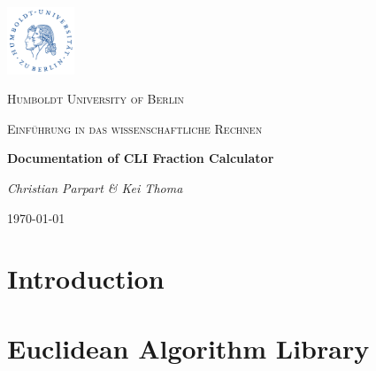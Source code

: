 \documentclass[refman]{scrartcl}
\begin{document}

\begin{titlepage}
	\centering
	\includegraphics[width=0.15\textwidth]{graphics/huberlin_logo}\par\vspace{1cm}
	{\scshape\LARGE Humboldt University of Berlin \par}
	\vspace{1cm}
	{\scshape\Large Einf{\"u}hrung in das wissenschaftliche Rechnen \par}
	\vspace{1.5cm}
	{\huge\bfseries Documentation of CLI Fraction Calculator\par}
	\vspace{2cm}
	{\Large\itshape Christian Parpart \& Kei Thoma \par}

	\vfill

	{\large \today\par}
\end{titlepage}

\tableofcontents
\newpage


\section{Introduction}


\section{Euclidean Algorithm Library}
\end{document}
